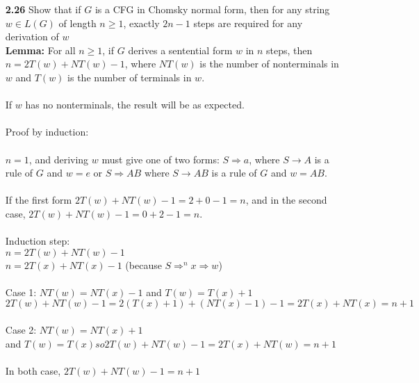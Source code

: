 \documentclass[12pt]{letter}
\newcommand\tab[1][2cm]{\hspace*{#1}}
\begin{document}
\begin{enumerate}
\newpage
\item[\textbf{2.26}] Show that if $G$ is a CFG in Chomsky normal form, then for any string $w \in L(G)$ of length $n \geq 1$, exactly $2n - 1$ steps are required for any derivation of $w$ \\
	\textbf{Lemma:} For all $n \geq 1$, if $G$ derives a sentential form $w$ in $n$ steps, then $n=2T(w) + NT(w) - 1$, where $NT(w)$ is the number of nonterminals in $w$ and $T(w)$ is the number of terminals in $w$. \\
	\leavevmode \\
	If $w$ has no nonterminals, the result will be as expected. \\
	\leavevmode \\
	Proof by induction: \\
	\leavevmode \\
	$n=1$, and deriving $w$ must give one of two forms: $S \Rightarrow a$, where $S \rightarrow A$ is a rule of $G$ and $w = e$ or $S \Rightarrow AB$ where $S \rightarrow AB$ is a rule of $G$ and $w = AB$. \\
	\leavevmode \\
	If the first form $2T(w) + NT(w) -1 = 2  + 0 - 1 = n$, and in the second case, $2T(w) + NT(w) - 1 = 0 + 2 - 1 = n$. \\
	\leavevmode \\
	Induction step:  \\
	\tab $n = 2T(w) + NT(w) - 1$\\
	\tab $n = 2T(x) + NT(x) - 1$  (because $S \Rightarrow ^nx \Rightarrow w$) \\
	\leavevmode \\
	Case 1: $NT(w)  = NT(x) - 1$ and $T(w) = T(x) + 1$ \\
	        $2T(w) + NT(w) - 1 = 2(T(x) + 1) + (NT(x) - 1) - 1 = 2T(x) + NT(x) = n + 1$ \\ 
	\leavevmode \\
	Case 2: $NT(w) = NT(x) + 1$ \\
	and $T(w)  = T(x) so 2T(w) + NT(w) - 1 = 2T(x) + NT(w) = n+ 1$ \\ 
	\leavevmode \\
	In both case, $2T(w) + NT(w) - 1 = n + 1$ \\


\end{enumerate}
\end{document}
